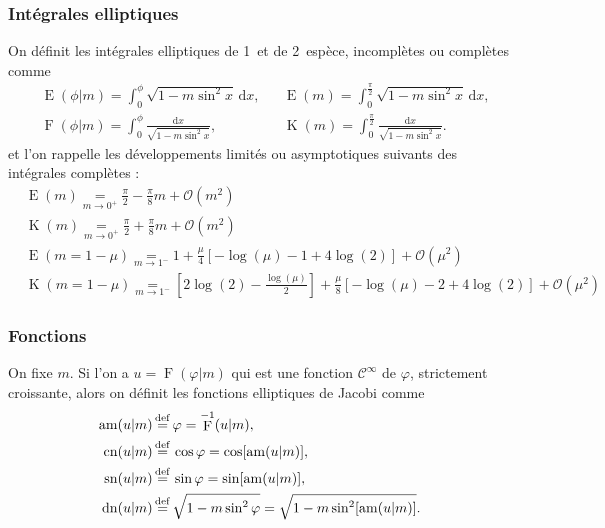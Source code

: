 \documentclass[10pt,a4paper, oneside, fleqn]{myarticle}
\newcommand{\dd}{\mathrm{d}}
\newcommand{\grandO}{\mathscr{O}}
\newcommand{\eqdef}{{\stackrel{\tiny \mathrm{def}}{=}}}
\DeclareMathOperator{\ellipF}{F}
\DeclareMathOperator{\ellipE}{E}
\DeclareMathOperator{\ellipK}{K}
\DeclareMathOperator{\cn}{cn}
\DeclareMathOperator{\sn}{sn}
\DeclareMathOperator{\dn}{dn}
\DeclareMathOperator{\am}{am}
\begin{document}
\subsubsection*{Intégrales elliptiques \boldmath{$\ellipE, \ellipF, \ellipK$}}
On définit les intégrales elliptiques de 1\iere\ et de 2\ieme\ espèce, incomplètes ou complètes comme
\begin{align}
  &\ellipE(\phi | m) = \int_0^\phi \sqrt{1-m\sin^2x}\,\dd x, &&\ellipE(m) = \int_0^{\frac\pi2} \sqrt{1-m\sin^2x}\,\dd x,\\
  &\ellipF(\phi | m) = \int_0^\phi \frac{\dd x}{\sqrt{1-m\sin^2x}}, &&\ellipK(m) = \int_0^{\frac\pi2} \frac{\dd x}{\sqrt{1-m\sin^2x}}.
\end{align}
et l'on rappelle les développements limités ou asymptotiques suivants des intégrales complètes :
\begin{align}
  &\ellipE(m) \underset{m\to 0^+}{=} \frac{\pi}{2} - \frac{\pi}{8} m + \grandO(m^2)\\
  &\ellipK(m) \underset{m\to 0^+}{=} \frac{\pi}{2} + \frac{\pi}{8} m + \grandO(m^2)\\
  &\ellipE(m=1-\mu) \underset{m\to 1^-}{=}1+\frac{\mu}{4}  \left[-\log(\mu)-1+4\log (2)\right]+\grandO\left(\mu^2\right)\\
  &\ellipK(m=1-\mu) \underset{m\to 1^-}{=}\left[2 \log (2)-\frac{\log (\mu
   )}{2}\right]+\frac{\mu}{8}  [-\log (\mu
   )-2+4 \log (2)]+\grandO\left(\mu ^2\right)
\end{align}

\subsubsection*{Fonctions \boldmath{$\cn, \sn, \dn, \am$}}
On fixe $m$. Si l'on a
$  u=\ellipF(\varphi|m)$ 
qui est une fonction $\mathscr{C}^\infty$ de $\varphi$, strictement croissante, alors on définit les fonctions elliptiques de Jacobi comme 
\begin{align}
  \am(u\vert m) &\,\eqdef\,  \varphi =\ellipF^{-1}(u\vert m),
  \\
  \cn(u\vert m) &\,\eqdef\,  \cos\varphi   = \cos[\am(u\vert m)] ,
  \\
  \sn(u\vert m) &\,\eqdef\,  \sin\varphi = \sin[\am(u\vert m)],
  \\
  \dn(u\vert m) &\,\eqdef\,  \sqrt{1-m\sin^2\varphi} = \sqrt{1-m\sin^2[\am(u\vert m)]  }.
\end{align}
\end{document}
